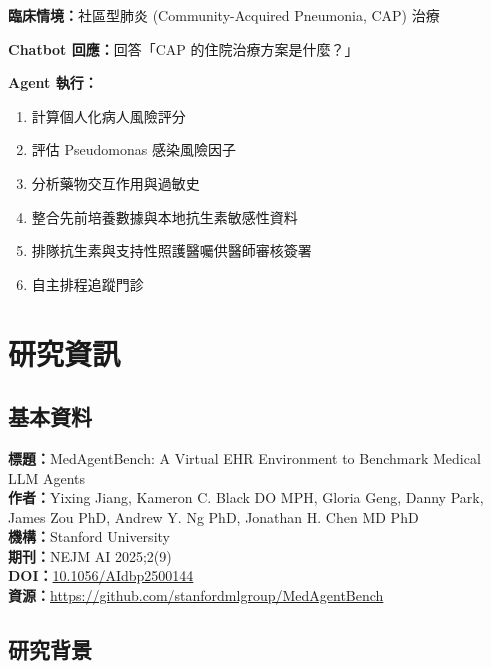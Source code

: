 \documentclass[12pt,a4paper]{article}
\begin{document}
\begin{tcolorbox}[colback=emergency_blue!5!white,colframe=emergency_blue,title=\textbf{Chatbot vs Agent 範例}]
\textbf{臨床情境：}社區型肺炎 (Community-Acquired Pneumonia, CAP) 治療

\textbf{Chatbot 回應：}回答「CAP 的住院治療方案是什麼？」

\textbf{Agent 執行：}
\begin{enumerate}
    \item 計算個人化病人風險評分
    \item 評估 Pseudomonas 感染風險因子
    \item 分析藥物交互作用與過敏史
    \item 整合先前培養數據與本地抗生素敏感性資料
    \item 排隊抗生素與支持性照護醫囑供醫師審核簽署
    \item 自主排程追蹤門診
\end{enumerate}
\end{tcolorbox}

\section{研究資訊}

\subsection{基本資料}

\textbf{標題：}MedAgentBench: A Virtual EHR Environment to Benchmark Medical LLM Agents\\
\textbf{作者：}Yixing Jiang, Kameron C. Black DO MPH, Gloria Geng, Danny Park, James Zou PhD, Andrew Y. Ng PhD, Jonathan H. Chen MD PhD\\
\textbf{機構：}Stanford University\\
\textbf{期刊：}NEJM AI 2025;2(9)\\
\textbf{DOI：}\href{https://doi.org/10.1056/AIdbp2500144}{10.1056/AIdbp2500144}\\
\textbf{資源：}\href{https://github.com/stanfordmlgroup/MedAgentBench}{https://github.com/stanfordmlgroup/MedAgentBench}

\subsection{研究背景}
\end{document}
